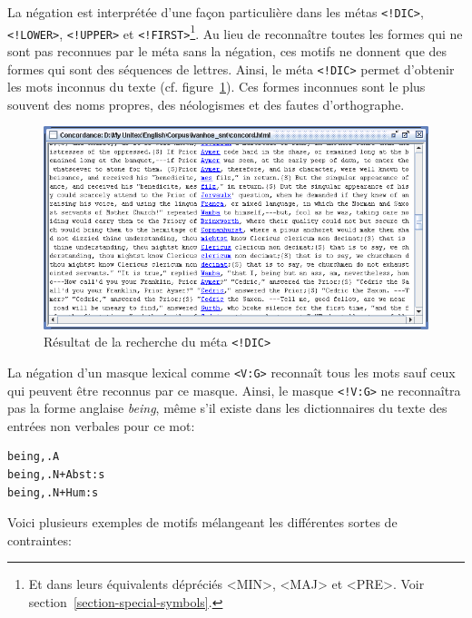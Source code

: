 \bigskip
\noindent La négation est interprétée d’une façon particulière dans les métas 
\verb+<!DIC>+, \verb+<!LOWER>+, \verb+<!UPPER>+ et
\verb+<!FIRST>+\footnote{Et dans leurs équivalents dépréciés <MIN>, <MAJ> et
<PRE>. Voir section~\ref{section-special-symbols}.}.
Au lieu de reconnaître toutes les formes qui ne sont pas reconnues
par le méta sans la négation, ces motifs ne donnent que des formes qui sont des séquences
de lettres. Ainsi, le méta \verb+<!DIC>+ permet d’obtenir les mots inconnus du texte (cf.
  figure~\ref{fig-search-<!DIC>}). Ces formes
inconnues sont le plus souvent des noms propres, des néologismes et des fautes d’orthographe.

\bigskip
\begin{figure}[h]
\begin{center}
\includegraphics[width=15cm]{resources/img/fig4-1.png}
\caption{Résultat de la recherche du méta \texttt{<!DIC>}\label{fig-search-<!DIC>}}
\end{center}
\end{figure}

\bigskip
\noindent La négation d’un masque lexical comme  \verb+<V:G>+ reconnaît tous les mots sauf ceux qui
peuvent être reconnus par ce masque. Ainsi, le masque \verb+<!V:G>+ ne reconnaîtra pas la forme
anglaise \emph{being}, même s’il existe dans les dictionnaires du texte des entrées non verbales pour ce
mot:

\begin{verbatim}
being,.A
being,.N+Abst:s
being,.N+Hum:s
\end{verbatim}

\noindent Voici plusieurs exemples de motifs mélangeant les différentes sortes de contraintes:

